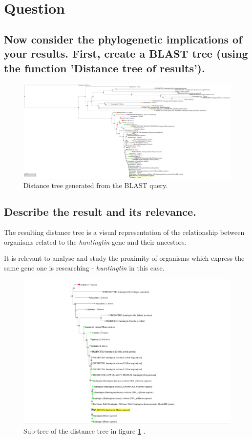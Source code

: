 \section{Question}

\subsection{Now consider the phylogenetic implications of your results. First, create a BLAST tree (using the function 'Distance tree of results').}

\begin{figure}[ht]
    \centering
    \includegraphics[width=\linewidth]{res/blast-tree.pdf}
    \caption{Distance tree generated from the BLAST query.}
    \label{fig:blast-tree}
\end{figure}


\subsection{Describe the result and its relevance.}

The resulting distance tree is a visual representation of the relationship between organisms related to the \textit{huntingtin} gene and their ancestors.

It is relevant to analyse and study the proximity of organisms which express the same gene one is researching - \textit{huntingtin} in this case.

\begin{figure}[ht]
    \centering
    \includegraphics[width=0.7\linewidth]{res/blast-tree-zoom.png}
    \caption{Sub-tree of the distance tree in figure \ref{fig:blast-tree} .}
    \label{fig:blast-subtree}
\end{figure}

